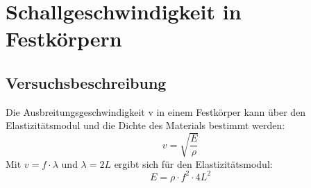 \documentclass[12pt,a4paper]{article}
\begin{document}
\section{Schallgeschwindigkeit in Festkörpern}
\subsection{Versuchsbeschreibung}
Die Ausbreitungsgeschwindigkeit v in einem Festkörper kann über den Elastizitätsmodul und die Dichte des Materials bestimmt werden:
\begin{equation}
v=\sqrt{\frac{E}{\rho}}
\end{equation}
Mit $v=f\cdot \lambda$ und $\lambda=2L$ ergibt sich für den Elastizitätsmodul:
\begin{equation}
E= \rho\cdot f^2\cdot 4L^2
\end{equation}
\end{document}

